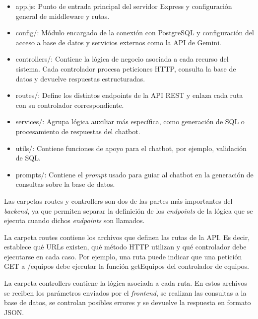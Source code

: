 \begin{itemize}
    \item {app.js:} Punto de entrada principal del servidor Express y configuración general de middleware y rutas.
    
    \item {config/:} Módulo encargado de la conexión con PostgreSQL y configuración del acceso a base de datos y servicios externos como la API de Gemini.
    
    \item {controllers/:} Contiene la lógica de negocio asociada a cada recurso del sistema. Cada controlador procesa peticiones HTTP, consulta la base de datos y devuelve respuestas estructuradas.
    
    \item {routes/:} Define los distintos endpoints de la API REST y enlaza cada ruta con su controlador correspondiente.
    
    \item {services/:} Agrupa lógica auxiliar más específica, como generación de SQL o procesamiento de respuestas del chatbot.

    \item {utils/:} Contiene funciones de apoyo para el chatbot, por ejemplo, validación de SQL.
    
    \item {prompts/:} Contiene el \textit{prompt} usado para guiar al chatbot en la generación de consultas sobre la base de datos.

    

\end{itemize}

Las carpetas routes y controllers son dos de las partes más importantes del \textit{backend}, ya que permiten separar la definición de los \textit{endpoints} de la lógica que se ejecuta cuando dichos \textit{endpoints} son llamados.

La carpeta routes contiene los archivos que definen las rutas de la API. Es decir, establece qué URLs existen, qué método HTTP utilizan y qué controlador debe ejecutarse en cada caso. Por ejemplo, una ruta puede indicar que una petición GET a /equipos debe ejecutar la función getEquipos del controlador de equipos.

La carpeta controllers contiene la lógica asociada a cada ruta. En estos archivos se reciben los parámetros enviados por el \textit{frontend}, se realizan las consultas a la base de datos, se controlan posibles errores y se devuelve la respuesta en formato JSON.

